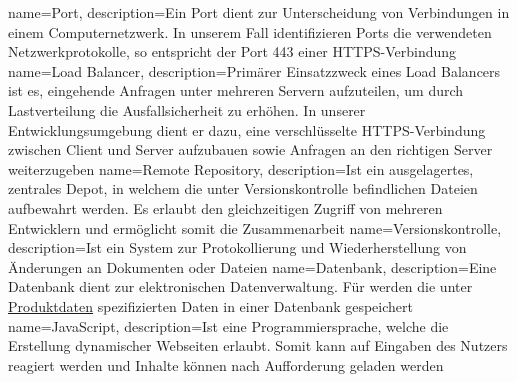 {
	name=Port,
	description={Ein Port dient zur Unterscheidung von Verbindungen in einem Computernetzwerk. In unserem Fall identifizieren Ports die verwendeten Netzwerkprotokolle, so entspricht der Port 443 einer HTTPS-Verbindung}
}
{
	name=Load Balancer,
	description={Primärer Einsatzzweck eines Load Balancers ist es, eingehende Anfragen unter mehreren Servern aufzuteilen, um durch Lastverteilung die Ausfallsicherheit zu erhöhen. In unserer Entwicklungsumgebung dient er dazu, eine verschlüsselte HTTPS-Verbindung zwischen Client und Server aufzubauen sowie Anfragen an den richtigen Server weiterzugeben}
}
{
	name=Remote Repository,
	description={Ist ein ausgelagertes, zentrales Depot, in welchem die unter Versionskontrolle befindlichen Dateien aufbewahrt werden. Es erlaubt den gleichzeitigen Zugriff von mehreren Entwicklern und ermöglicht somit die Zusammenarbeit}
}
{
	name=Versionskontrolle,
	description={Ist ein System zur Protokollierung und Wiederherstellung von Änderungen an Dokumenten oder Dateien}
}
{
	name=Datenbank,
	description={Eine Datenbank dient zur elektronischen Datenverwaltung. Für \name werden die unter \hyperref[sec:data]{Produktdaten} spezifizierten Daten in einer Datenbank gespeichert}
}
{
	name=JavaScript,
	description={Ist eine Programmiersprache, welche die Erstellung dynamischer Webseiten erlaubt. Somit kann auf Eingaben des Nutzers reagiert werden und Inhalte können nach Aufforderung geladen werden}
}

